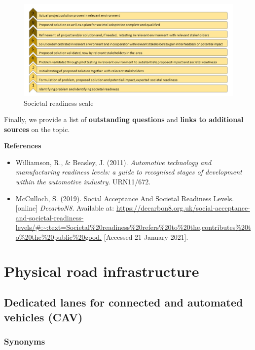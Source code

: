 \documentclass[
]{book}
\providecommand{\tightlist}{%
  \setlength{\itemsep}{0pt}\setlength{\parskip}{0pt}}
\begin{document}
\begin{figure}
\includegraphics[width=0.9\linewidth]{image/SRL_cropped} \caption{Societal readiness scale}\label{fig:unnamed-chunk-3}
\end{figure}

Finally, we provide a list of \textbf{outstanding questions} and \textbf{links to additional sources} on the topic.

\textbf{References}

\begin{itemize}
\tightlist
\item
  Williamson, R., \& Beasley, J. (2011). \emph{Automotive technology and manufacturing readiness levels: a guide to recognised stages of development within the automotive industry}. URN11/672.
\item
  McCulloch, S. (2019). Social Acceptance And Societal Readiness Levels. {[}online{]} \emph{DecarboN8}. Available at: \url{https://decarbon8.org.uk/social-acceptance-and-societal-readiness-levels/\#:~:text=Societal\%20readiness\%20refers\%20to\%20the,contributes\%20to\%20the\%20public\%20good.} {[}Accessed 21 January 2021{]}.
\end{itemize}

\hypertarget{infrastructure}{%
\chapter{Physical road infrastructure}\label{infrastructure}}

\hypertarget{dedicated_lanes}{%
\section{Dedicated lanes for connected and automated vehicles (CAV)}\label{dedicated_lanes}}

\hypertarget{synonyms}{%
\subsection*{Synonyms}\label{synonyms}}
\end{document}
